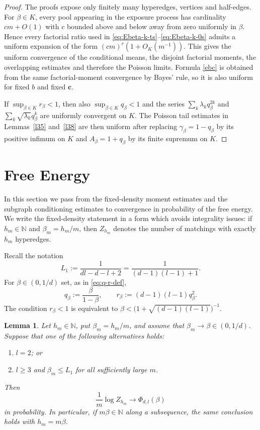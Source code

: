 \documentclass[11pt]{amsart}
\theoremstyle{plain}
\newtheorem{lemma}[theorem]{Lemma}
\numberwithin{equation}{section}
\numberwithin{theorem}{section}
\numberwithin{figure}{section}
\begin{document}
\begin{proof}
The proofs expose only finitely many hyperedges, vertices and half-edges.  For
$\beta\in K$, every pool appearing in the exposure process has cardinality
$c m+O(1)$ with $c$ bounded above and below away from zero uniformly in
$\beta$.  Hence every factorial ratio used in
\eqref{eq:Ebeta-k-ts}--\eqref{eq:Ebeta-k-0s} admits a uniform expansion of the
form $(cm)^r(1+O_K(m^{-1}))$.  This gives the uniform convergence of the
conditional means, the disjoint factorial moments, the overlapping estimates and
therefore the Poisson limits.  Formula \eqref{ebc} is obtained from the same
factorial-moment convergence by Bayes' rule, so it is also uniform for fixed
$b$ and fixed $\mathbf c$.

If $\sup_{\beta\in K}r_\beta<1$, then also
$\sup_{\beta\in K}q_\beta<1$ and the series
$\sum_k\lambda_k q_\beta^{2k}$ and
$\sum_k\sqrt{\lambda_k}q_\beta^k$ are uniformly convergent on $K$.  The Poisson
tail estimates in Lemmas~\ref{l35} and~\ref{l38} are then uniform after replacing
$\gamma_\beta=1-q_\beta$ by its positive infimum on $K$ and
$A_\beta=1+q_\beta$ by its finite supremum on $K$.
\end{proof}


\section{Free Energy}\label{fe}

In this section we pass from the fixed-density moment estimates and the subgraph
conditioning estimates to convergence in probability of the free energy.  We write the
fixed-density statement in a form which avoids integrality issues: if
$h_m\in\mathbb N$ and $\beta_m=h_m/m$, then $Z_{h_m}$ denotes the number of
matchings with exactly $h_m$ hyperedges.

Recall the notation
\begin{equation}\label{eq:section5-L1}
  L_1:=\frac1{dl-d-l+2}=\frac1{(d-1)(l-1)+1}.
\end{equation}
For $\beta\in(0,1/d)$ set, as in \eqref{eq:q-r-def},
\begin{equation}\label{eq:section5-q-r}
  q_\beta:=\frac{\beta}{1-\beta},\qquad
  r_\beta:=(d-1)(l-1)q_\beta^2.
\end{equation}
The condition $r_\beta<1$ is equivalent to
$\beta<\bigl(1+\sqrt{(d-1)(l-1)}\bigr)^{-1}$.

\begin{lemma}\label{l51}
Let $h_m\in\mathbb N$, put $\beta_m=h_m/m$, and assume that
$\beta_m\to\beta\in(0,1/d)$.  Suppose that one of the following alternatives holds:
\begin{enumerate}
\item $l=2$; or
\item $l\ge3$ and $\beta_m\le L_1$ for all sufficiently large $m$.
\end{enumerate}
Then
\begin{equation}\label{cfe}
  \frac1m\log Z_{h_m}\longrightarrow \Phi_{d,l}(\beta)
\end{equation}
in probability.  In particular, if $m\beta\in\mathbb N$ along a subsequence, the
same conclusion holds with $h_m=m\beta$.
\end{lemma}
\end{document}
